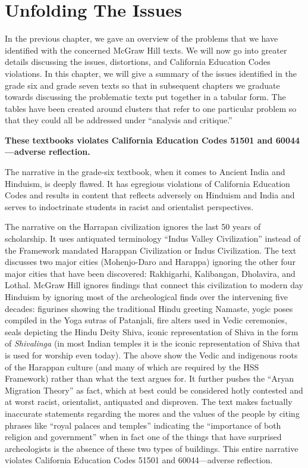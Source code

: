 \chapter{Unfolding The Issues}

In the previous chapter, we gave an overview of the problems that we have identified with the concerned McGraw Hill texts. We will now go into greater details discussing the issues, distortions, and California Education Codes violations. In this chapter, we will give a summary of the issues identified in the grade six and grade seven texts so that in subsequent chapters we graduate towards discussing the problematic texts put together in a tabular form. The tables have been created around clusters that refer to one particular problem so that they could all be addressed under “analysis and critique.”  

\textbf{These textbooks violates California Education Codes 51501 and 60044—adverse reflection.} 

The narrative in the grade-six textbook, when it comes to Ancient India and Hinduism, is deeply flawed. It has egregious violations of California Education Codes and results in content that reflects adversely on Hinduism and India and serves to indoctrinate students in racist and orientalist perspectives.

The narrative on the Harrapan civilization ignores the last 50 years of scholarship. It uses antiquated terminology “Indus Valley Civilization” instead of the Framework mandated Harappan Civilization or Indus Civilization. The text discusses two major cities (Mohenjo-Daro and Harappa) ignoring the other four major cities that have been discovered: Rakhigarhi, Kalibangan, Dholavira, and Lothal. McGraw Hill ignores findings that connect this civilization to modern day Hinduism by ignoring most of the archeological finds over the intervening five decades: figurines showing the traditional Hindu greeting Namaste, yogic poses compiled in the Yoga sutras of Patanjali, fire alters used in Vedic ceremonies, seals depicting the Hindu Deity Shiva, iconic representation of Shiva in the form of \textit{Shivalinga}  (in most Indian temples it is the iconic representation of Shiva that is used for worship even today). The above show the Vedic and indigenous roots of the Harappan culture (and many of which are required by the HSS Framework) rather than what the text argues for. It further pushes the “Aryan Migration Theory” as fact, which at best could be considered hotly contested and at worst racist, orientalist, antiquated and disproven. The text makes factually inaccurate statements regarding the mores and the values of the people by citing phrases like “royal palaces and temples” indicating the “importance of both religion and government” when in fact one of the things that have surprised archeologists is the absence of these two types of buildings. This entire narrative violates California Education Codes 51501 and 60044—adverse reflection.  

